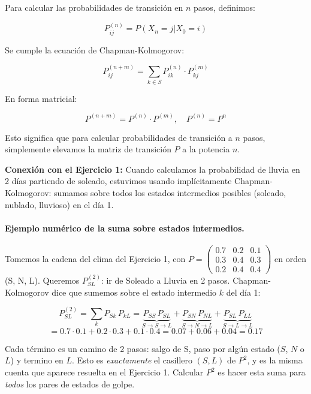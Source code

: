 \documentclass[a4paper,11pt]{article}
\begin{document}
\vspace{0.5em}

Para calcular las probabilidades de transición en $n$ pasos, definimos:

\[P_{ij}^{(n)} = P(X_n = j | X_0 = i)\]

Se cumple la ecuación de Chapman-Kolmogorov:

\[P_{ij}^{(n+m)} = \sum_{k \in S} P_{ik}^{(n)} \cdot P_{kj}^{(m)}\]

En forma matricial:

\[P^{(n+m)} = P^{(n)} \cdot P^{(m)}, \quad P^{(n)} = P^n\]

Esto significa que para calcular probabilidades de transición a $n$ pasos, simplemente elevamos la matriz de transición $P$ a la potencia $n$.

\vspace{0.5em}

\textbf{Conexión con el Ejercicio 1:} Cuando calculamos la probabilidad de lluvia en 2 días partiendo de soleado, estuvimos usando implícitamente Chapman-Kolmogorov: sumamos sobre todos los estados intermedios posibles (soleado, nublado, lluvioso) en el día 1.

\paragraph{Ejemplo numérico de la suma sobre estados intermedios.} Tomemos la cadena del clima del Ejercicio 1, con $P = \begin{pmatrix} 0.7 & 0.2 & 0.1 \\ 0.3 & 0.4 & 0.3 \\ 0.2 & 0.4 & 0.4 \end{pmatrix}$ en orden (S, N, L). Queremos $P_{SL}^{(2)}$: ir de Soleado a Lluvia en 2 pasos. Chapman-Kolmogorov dice que sumemos sobre el estado intermedio $k$ del día 1:

\[
P_{SL}^{(2)} = \sum_{k} P_{Sk}\, P_{kL} = \underbrace{P_{SS}\,P_{SL}}_{S\to S\to L} + \underbrace{P_{SN}\,P_{NL}}_{S\to N\to L} + \underbrace{P_{SL}\,P_{LL}}_{S\to L\to L}
\]
\[
= 0.7 \cdot 0.1 + 0.2 \cdot 0.3 + 0.1 \cdot 0.4 = 0.07 + 0.06 + 0.04 = 0.17
\]

Cada término es un camino de 2 pasos: salgo de S, paso por algún estado ($S$, $N$ o $L$) y termino en $L$. Esto es \emph{exactamente} el casillero $(S,L)$ de $P^2$, y es la misma cuenta que aparece resuelta en el Ejercicio 1. Calcular $P^2$ es hacer esta suma para \emph{todos} los pares de estados de golpe.
\end{document}
